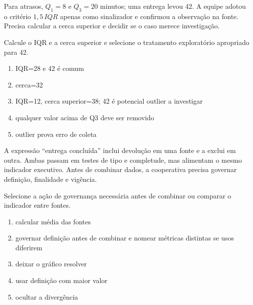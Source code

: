 \TextoBase

Para atrasos, $Q_1=8$ e $Q_3=20$ minutos; uma entrega levou 42. A equipe adotou o critério $1{,}5\,IQR$ apenas como sinalizador e confirmou a observação na fonte. Precisa calcular a cerca superior e decidir se o caso merece investigação.

\FonteDidatica

\Comando Calcule o IQR e a cerca superior e selecione o tratamento exploratório apropriado para 42.

\begin{enumerate}[label=\Alph*)]

\item IQR=28 e 42 é comum

\item cerca=32

\item IQR=12, cerca superior=38; 42 é potencial outlier a investigar

\item qualquer valor acima de Q3 deve ser removido

\item outlier prova erro de coleta

\end{enumerate}


\TextoBase

A expressão ``entrega concluída'' inclui devolução em uma fonte e a exclui em outra. Ambas passam em testes de tipo e completude, mas alimentam o mesmo indicador executivo. Antes de combinar dados, a cooperativa precisa governar definição, finalidade e vigência.

\FonteDidatica

\Comando Selecione a ação de governança necessária antes de combinar ou comparar o indicador entre fontes.

\begin{enumerate}[label=\Alph*)]

\item calcular média das fontes

\item governar definição antes de combinar e nomear métricas distintas se usos diferirem

\item deixar o gráfico resolver

\item usar definição com maior valor

\item ocultar a divergência

\end{enumerate}

